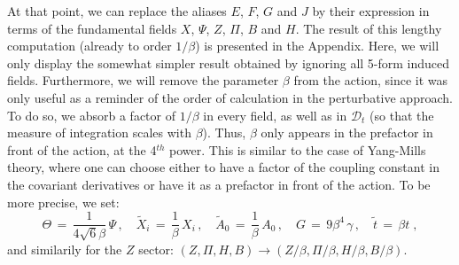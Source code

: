 \documentclass[a4paper,11pt]{article}
\begin{document}
At that point, we can replace the aliases $E$, $F$, $G$ and $J$ by their expression in terms of
the fundamental fields $X$, $\Psi$, $Z$, $\Pi$, $B$ and $H$. The result of this lengthy computation
(already to order $1/\beta$) is presented in the Appendix.
Here, we will only display the somewhat simpler result obtained by ignoring all 5-form induced fields.
Furthermore, we will remove the parameter $\beta$ from the action, since it was only 
useful as a reminder of the order of calculation in the perturbative approach. To do so, 
we absorb a factor of $1/\beta$ in every field, as well as in ${\mathcal D}_t$ (so that 
the measure of integration scales with $\beta$).
Thus, $\beta$ only appears in the prefactor in front of the action, at the 4$^{th}$ power.
This is similar to the case of Yang-Mills theory, where one can choose either to have
a factor of the coupling constant in the covariant derivatives or have it as a prefactor
in front of the action. To be more precise, we set:
\begin{equation*}
\Theta \,= \,\frac{1}{4\sqrt{6}\beta} \,\Psi\,,\quad \widetilde{X}_i\,=\,\frac{1}{\beta}\,X_i\,,
\quad \widetilde{A}_0\,=\,\frac{1}{\beta}\,A_0\,,\quad G\,=\,9 \beta^4\, \gamma\,,\quad \tilde{t}\,=\,
\beta t\;,
\end{equation*}
and similarily for the $Z$ sector: $(Z,\Pi,H,B)\rightarrow (Z/\beta ,\Pi/\beta ,H/\beta ,B/\beta )$.
\end{document}
